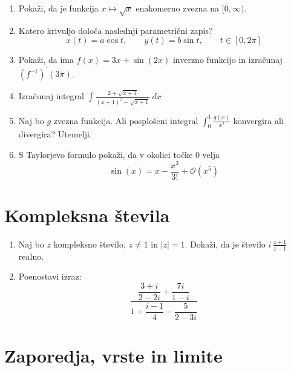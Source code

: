 \documentclass[a4paper,12pt]{article}
\begin{document}
\begin{enumerate}
\item
Pokaži, da je funkcija $x \mapsto \sqrt{x}$ enakomerno zvezna na $[0, \infty)$.

\item
Katero krivuljo določa naslednji parametrični zapis?
\[
x(t) = a \cos t, \qquad %
y(t) = b \sin t, \qquad %
t \in [0, 2 \pi]
\]

\item
Pokaži, da ima $f(x) = 3x + \sin(2x)$ inverzno funkcijo in izračunaj $(f^{-1})^{\prime}(3\pi)$.

\item
Izračunaj integral
$
\displaystyle
\int{\frac{2+\sqrt{x+1}}{(x+1)^2-\sqrt{x+1}} \ dx}
$
\item
Naj bo \(g\) zvezna funkcija. Ali posplošeni integral
$\int_{0}^{1} \frac{g(x)}{x^2}$
konvergira ali divergira? Utemelji.

\item
S Taylorjevo formulo pokaži, da v okolici točke \(0\) velja
\[
\sin(x) = x - \frac{x^3}{3!} + \mathcal{O}(x^5)
\]
\end{enumerate}

\section*{Kompleksna števila}

\begin{enumerate}
\item
Naj bo \(z\) kompleksno število, \(z \ne 1\) in $|z|= 1$.
Dokaži, da je število \( i \, \frac{z+1}{z-1} \) realno.

\item
Poenostavi izraz:
\[
\frac{\dfrac{3 + i}{2 - 2i}+\dfrac{7i}{1-i}}{1 + \dfrac{i - 1}{4}-\dfrac{5}{2-3i}}
\]
\end{enumerate}

\section*{Zaporedja, vrste in limite}
\end{document}
